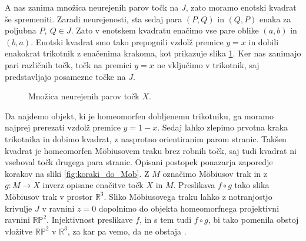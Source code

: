 \documentclass[mat1]{fmfdelo}
\newcommand{\R}{\mathbb R}
\newcommand{\arrows}[5][]{
  \draw[->, #1] (#2, #3) -- (0.75*#2 + 0.25*#4, 0.75*#3 + 0.25*#5);
  \draw[->, #1] (0.75*#2 + 0.25*#4, 0.75*#3 + 0.25*#5) -- (0.5*#2 + 0.5*#4, 0.5*#3 + 0.5*#5);
  \draw[->, #1] (0.5*#2 + 0.5*#4, 0.5*#3 + 0.5*#5) -- (0.25*#2 + 0.75*#4, 0.25*#3 + 0.75*#5);
  \draw[->, #1] (0.25*#2 + 0.75*#4, 0.25*#3 + 0.75*#5) -- (#4, #5);
}
\begin{document}
A nas zanima množica neurejenih parov točk na $J$, zato moramo enotski kvadrat še spremeniti. Zaradi neurejenosti, sta sedaj para $(P, Q)$ in $(Q, P)$ enaka za poljubna $P,\ Q \in J$. Zato v enotskem kvadratu enačimo vse pare oblike $(a, b)$ in $(b, a)$. Enotski kvadrat smo tako prepognili vzdolž premice $y = x$ in dobili enakokrat trikotnik z enačenima krakoma, kot prikazuje slika \ref{fig:prvi_pregib}. Ker nas zanimajo pari različnih točk, točk na premici $y = x$ ne vključimo v trikotnik, saj predstavljajo posamezne točke na $J$. 

\begin{figure}[h!]
\caption{Množica neurejenih parov točk $X$.}
\label{fig:prvi_pregib}
\end{figure}

Da najdemo objekt, ki je homeomorfen dobljenemu trikotniku, ga moramo najprej prerezati vzdolž premice $y = 1 - x$. Sedaj lahko zlepimo prvotna kraka trikotnika in dobimo kvadrat, z nasprotno orientiranim parom stranic. Takšen kvadrat je homeomorfen M\"obiusovem traku brez robnih točk, saj tudi kvadrat ni vseboval točk drugega para stranic. Opisani postopek ponazarja zaporedje korakov na sliki \ref{fig:koraki_do_Mob}. Z $M$ označimo M\"obiusov trak in z $g \colon M \to X$ inverz opisane enačitve točk $X$ in $M$. Preslikava $f \circ g$ tako slika M\"obiusov trak v prostor $\R^3$. Sliko M\"obiusovega traku lahko z notranjostjo krivulje $J$ v ravnini $z=0$ dopolnimo do objekta homeomorfnega projektivni ravnini $\R \mathbb{P} ^2$. Injektivnost preslikave $f$, in s tem tudi $f \circ g$, bi tako pomenila obstoj vložitve $\R\mathbb{P}^2$ v $\R^3$, za kar pa vemo, da ne obstaja \cite{rp2_wiki}.
\end{document}
